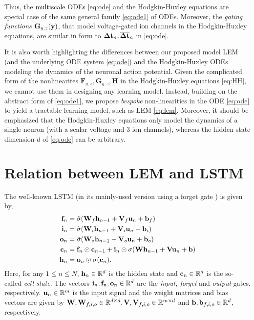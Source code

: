 \documentclass{article} \usepackage{iclr2022_conference,times}
\newcommand{\by}{{\bf y}}
\newcommand{\bW}{{\bf W}}
\newcommand{\bu}{{\bf u}}
\newcommand{\bb}{{\bf b}}
\newcommand{\bV}{{\bf V}}
\newcommand{\R}{{\mathbb R}}
\newcommand{\Dt}{{\Delta t}}
\begin{document}
Thus, the multiscale ODEs \eqref{eq:ode} and the Hodgkin-Huxley equations are special case of the same general family \eqref{eq:ode1} of ODEs. Moreover, the \emph{gating functions} $\mathbf{G}_{y,z}(\by)$, that model voltage-gated ion channels in the Hodgkin-Huxley equations, are similar in form to ${\bf \Dt}_n,\overline{\bf \Dt}_n$ in \eqref{eq:ode}.  

It is also worth highlighting the differences between our proposed model LEM (and the underlying ODE system \eqref{eq:ode}) and the Hodgkin-Huxley ODEs modeling the dynamics of the neuronal action potential. Given the complicated form of the nonlinearites $\mathbf{F}_{y,z},\mathbf{G}_{y,z},\mathbf{H}$ in the Hodgkin-Huxley equations \eqref{eq:HH}, we cannot use them in designing any learning model. Instead, building on the abstract form of \eqref{eq:ode1}, we propose \emph{bespoke} non-linearities in the ODE \eqref{eq:ode} to yield a tractable learning model, such as LEM \eqref{eq:lem}. Moreover, it should be emphasized that the Hodgkin-Huxley equations only model the dynamics of a single neuron (with a scalar voltage and 3 ion channels), whereas the hidden state dimension $d$ of \eqref{eq:ode} can be arbitrary. 

\section{Relation between LEM and LSTM}
\label{app:lstm}
The well-known LSTM \citep{lstm} (in its mainly-used version using a forget gate \citep{lstm_w_forget}) is given by, 
\begin{equation}
    \label{eq:lstm}
    \begin{aligned}
    {\bf f}_n &= \hat{\sigma}(\bW_f{\bf h}_{n-1} + \bV_f\bu_{n} + \bb_f) \\
    {\bf i}_n &= \hat{\sigma}(\bW_i{\bf h}_{n-1} + \bV_i\bu_{n} + \bb_i) \\
    {\bf o}_n &= \hat{\sigma}(\bW_o{\bf h}_{n-1} + \bV_o\bu_{n} + \bb_o) \\
    {\bf c}_n &= {\bf f}_n \odot {\bf c}_{n-1} + {\bf i}_n \odot\sigma(\bW {\bf h}_{n-1} + \bV \bu_{n} + \bb) \\
    {\bf h}_n &= {\bf o}_n \odot \sigma({\bf c}_n).
\end{aligned}
\end{equation}
Here, for any $1 \leq n \leq N$, ${\bf h}_n \in \R^d$ is the hidden state and ${\bf c}_n \in \R^d$ is the so-called \emph{cell state}. The vectors ${\bf i}_n,{\bf f}_n,{\bf o}_n \in \R^d$ are the \emph{input, forget} and \emph{output} gates, respectively. $\bu_n \in \R^m$ is the input signal and the weight matrices and bias vectors are given by $\bW, \bW_{f,i,o}\in \R^{d\times d}, \bV, \bV_{f,i,o}\in \R^{m \times d}$ and $\bb,\bb_{f,i,o} \in \R^d$, respectively. 
\end{document}
